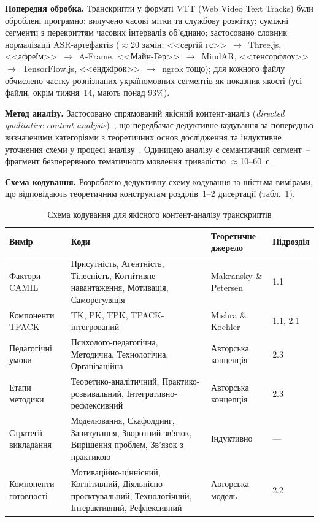 \textbf{Попередня обробка.} Транскрипти у форматі VTT (Web Video Text Tracks) були оброблені програмно: вилучено часові мітки та службову розмітку; суміжні сегменти з перекриттям часових інтервалів об'єднано; застосовано словник нормалізації ASR-артефактів ($\approx$20 замін: <<сергій гс>>~$\to$~Three.js, <<афреїм>>~$\to$~A-Frame, <<Майн-Гер>>~$\to$~MindAR, <<тенсорфлоу>>~$\to$~TensorFlow.js, <<енджірок>>~$\to$~ngrok тощо); для кожного файлу обчислено частку розпізнаних україномовних сегментів як показник якості (усі файли, окрім тижня~14, мають понад 93\%).

\textbf{Метод аналізу.} Застосовано спрямований якісний контент-аналіз (\textit{directed qualitative content analysis})~\cite{Hsieh2005QCA, Mayring2014QCA}, що передбачає дедуктивне кодування за попередньо визначеними категоріями з теоретичних основ дослідження та індуктивне уточнення схеми у процесі аналізу~\cite{Kuckartz2019QTA}. Одиницею аналізу є семантичний сегмент~--фрагмент безперервного тематичного мовлення тривалістю $\approx$10--60~с.

\textbf{Схема кодування.} Розроблено дедуктивну схему кодування за шістьма вимірами, що відповідають теоретичним конструктам розділів~1--2 дисертації (табл.~\ref{tab:coding_scheme}).

\begin{table}[!h]
\centering
\caption{Схема кодування для якісного контент-аналізу транскриптів}
\label{tab:coding_scheme}
\small
\begin{tabular}{|p{3cm}|p{5cm}|p{3.5cm}|p{2cm}|}
\hline
\textbf{Вимір} & \textbf{Коди} & \textbf{Теоретичне джерело} & \textbf{Підрозділ} \\
\hline
Фактори CAMIL & Присутність, Агентність, Тілесність, Когнітивне навантаження, Мотивація, Саморегуляція & Makransky \& Petersen & 1.1 \\
\hline
Компоненти TPACK & TK, PK, TPK, TPACK-інтегрований & Mishra \& Koehler & 1.1, 2.1 \\
\hline
Педагогічні умови & Психолого-педагогічна, Методична, Технологічна, Організаційна & Авторська концепція & 2.3 \\
\hline
Етапи методики & Теоретико-аналітичний, Практико-розвивальний, Інтегративно-рефлексивний & Авторська концепція & 2.3 \\
\hline
Стратегії викладання & Моделювання, Скафолдинг, Запитування, Зворотний зв'язок, Вирішення проблем, Зв'язок з практикою & Індуктивно & --- \\
\hline
Компоненти готовності & Мотиваційно-ціннісний, Когнітивний, Діяльнісно-проєктувальний, Технологічний, Інтерактивний, Рефлексивний & Авторська модель & 2.2 \\
\hline
\end{tabular}
\end{table}

